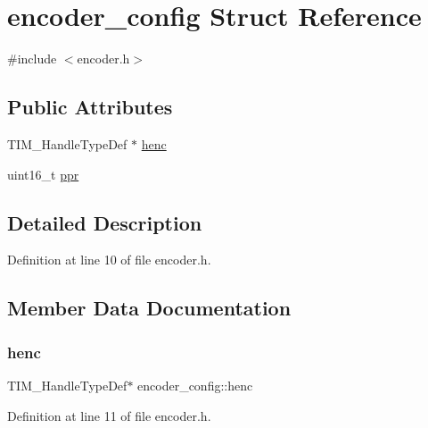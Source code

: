 \hypertarget{structencoder__config}{}\section{encoder\+\_\+config Struct Reference}
\label{structencoder__config}


{\ttfamily \#include $<$encoder.\+h$>$}

\subsection*{Public Attributes}
\begin{DoxyCompactItemize}
\item 
T\+I\+M\+\_\+\+Handle\+Type\+Def $\ast$ \mbox{\hyperlink{structencoder__config_a125e5144655af6342d91ea30da9a4189}{henc}}
\item 
uint16\+\_\+t \mbox{\hyperlink{structencoder__config_afb9cd180fa1749a182f6178a4f417280}{ppr}}
\end{DoxyCompactItemize}


\subsection{Detailed Description}


Definition at line 10 of file encoder.\+h.



\subsection{Member Data Documentation}
\mbox{\label{structencoder__config_a125e5144655af6342d91ea30da9a4189}} 
\subsubsection{\texorpdfstring{henc}{henc}}
{\footnotesize\ttfamily T\+I\+M\+\_\+\+Handle\+Type\+Def$\ast$ encoder\+\_\+config\+::henc}



Definition at line 11 of file encoder.\+h.

\mbox{\label{structencoder__config_afb9cd180fa1749a182f6178a4f417280}} 

